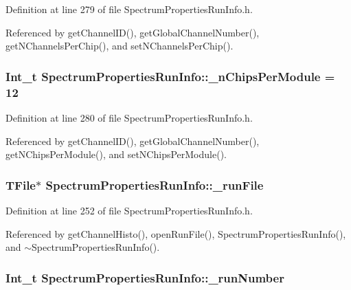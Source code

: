 Definition at line 279 of file SpectrumPropertiesRunInfo.h.

Referenced by getChannelID(), getGlobalChannelNumber(), getNChannelsPerChip(), and setNChannelsPerChip().\hypertarget{class_spectrum_properties_run_info_a67b550f7e4ba507ae8953f57c15f62f3}{
\subsubsection[{\_\-nChipsPerModule}]{\setlength{\rightskip}{0pt plus 5cm}Int\_\-t {\bf SpectrumPropertiesRunInfo::\_\-nChipsPerModule} = 12}}
\label{class_spectrum_properties_run_info_a67b550f7e4ba507ae8953f57c15f62f3}


Definition at line 280 of file SpectrumPropertiesRunInfo.h.

Referenced by getChannelID(), getGlobalChannelNumber(), getNChipsPerModule(), and setNChipsPerModule().\hypertarget{class_spectrum_properties_run_info_aab03a803b16b50f0d444f031b41ffebc}{
\subsubsection[{\_\-runFile}]{\setlength{\rightskip}{0pt plus 5cm}TFile$\ast$ {\bf SpectrumPropertiesRunInfo::\_\-runFile}}}
\label{class_spectrum_properties_run_info_aab03a803b16b50f0d444f031b41ffebc}


Definition at line 252 of file SpectrumPropertiesRunInfo.h.

Referenced by getChannelHisto(), openRunFile(), SpectrumPropertiesRunInfo(), and $\sim$SpectrumPropertiesRunInfo().\hypertarget{class_spectrum_properties_run_info_af3b62d094196da758718fbc1d05eed96}{
\subsubsection[{\_\-runNumber}]{\setlength{\rightskip}{0pt plus 5cm}Int\_\-t {\bf SpectrumPropertiesRunInfo::\_\-runNumber}}}
\label{class_spectrum_properties_run_info_af3b62d094196da758718fbc1d05eed96}


